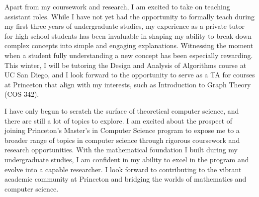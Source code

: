 \documentclass[12pt]{article}
\begin{document}
Apart from my coursework and research, I am excited to take on teaching assistant roles. While I
have not yet had the opportunity to formally teach during my first three years of undergraduate
studies, my experience as a private tutor for high school students has been invaluable in shaping my
ability to break down complex concepts into simple and engaging explanations. Witnessing the moment
when a student fully understanding a new concept has been especially rewarding. This winter, I will
be tutoring the Design and Analysis of Algorithms course at UC San Diego, and I look forward to the
opportunity to serve as a TA for courses at Princeton that align with my interests, such as
Introduction to Graph Theory (COS 342).

I have only begun to scratch the surface of theoretical computer science, and there are still a lot
of topics to explore. I am excited about the prospect of joining Princeton's Master's in Computer
Science program to expose me to a broader range of topics in computer science through rigorous
coursework and research opportunities. With the mathematical foundation I built during my
undergraduate studies, I am confident in my ability to excel in the program and evolve into a
capable researcher. I look forward to contributing to the vibrant academic community at Princeton
and bridging the worlds of mathematics and computer science.

\newpage



\end{document}
